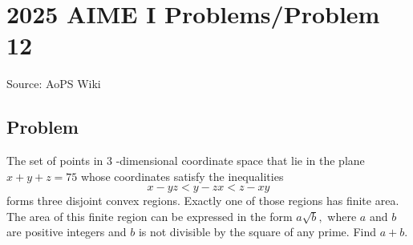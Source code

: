 \documentclass[12pt]{article}
\begin{document}
\section*{{2025 AIME I Problems/Problem 12}}
Source: AoPS Wiki

\subsection*{Problem}
The set of points in $3$ -dimensional coordinate space that lie in the plane $x+y+z=75$ whose coordinates satisfy the inequalities \[x-yz<y-zx<z-xy\] forms three disjoint convex regions. Exactly one of those regions has finite area. The area of this finite region can be expressed in the form $a\sqrt{b},$ where $a$ and $b$ are positive integers and $b$ is not divisible by the square of any prime. Find $a+b.$
\end{document}

